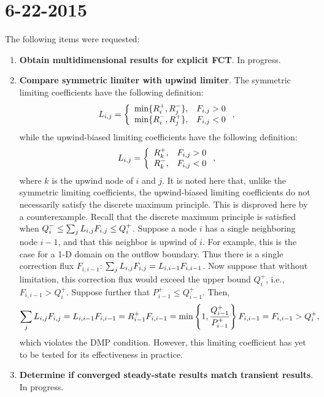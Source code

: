 \section*{6-22-2015}

The following items were requested:
\begin{enumerate}

\item \textbf{Obtain multidimensional results for explicit FCT}.
In progress.

\item \textbf{Compare symmetric limiter with upwind limiter}.
The symmetric limiting coefficients have the following definition:
\begin{equation}
  L_{i,j} = \left\{\begin{array}{l l}
    \min\{R_i^+,R_j^-\}, & F_{i,j} > 0 \\
    \min\{R_i^-,R_j^+\}, & F_{i,j} < 0
  \end{array}\right.,
\end{equation}
while the upwind-biased limiting coefficients have the following definition:
\begin{equation}
  L_{i,j} = \left\{\begin{array}{l l}
    R_k^+, & F_{i,j} > 0 \\
    R_k^-, & F_{i,j} < 0
  \end{array}\right.,
\end{equation}
where $k$ is the upwind node of $i$ and $j$. It is noted here that, unlike
the symmetric limiting coefficients, the upwind-biased limiting coefficients
do not necessarily satisfy the discrete maximum principle. This is disproved
here by a counterexample. Recall that the discrete maximum principle is satisfied when
$Q_i^-\le \sum_j L_{i,j} F_{i,j}\le Q_i^+$. Suppose a node $i$ has a single
neighboring node $i-1$, and that this neighbor is upwind of $i$. For example, this is
the case for a 1-D domain on the outflow boundary. Thus there is a single
correction flux $F_{i,i-1}$: $\sum_j L_{i,j} F_{i,j}=L_{i,i-1} F_{i,i-1}$. Now
suppose that without limitation, this correction flux would exceed the
upper bound $Q_i^+$, i.e., $F_{i,i-1}>Q_i^+$. Suppose further that
$P_{i-1}^+\leq Q_{i-1}^+$. Then,
\[
  \sum\limits_j L_{i,j} F_{i,j}=
  L_{i,i-1} F_{i,i-1}=
  R_{i-1}^+ F_{i,i-1}=
  \min\left\{1,\frac{Q_{i-1}^+}{P_{i-1}^+}\right\} F_{i,i-1}=
  F_{i,i-1}>
  Q_i^+,
\]
which violates the DMP condition. However, this limiting coefficient has
yet to be tested for its effectiveness in practice.

\item \textbf{Determine if converged steady-state results match transient results}.
In progress.


\end{enumerate}
